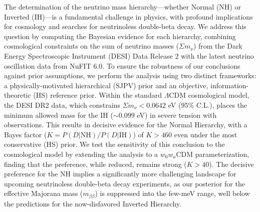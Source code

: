 \documentclass[]{article}
\begin{document}
The determination of the neutrino mass hierarchy—whether Normal (NH) or Inverted (IH)—is a fundamental challenge in physics, with profound implications for cosmology and searches for neutrinoless double-beta decay. We address this question by computing the Bayesian evidence for each hierarchy, combining cosmological constraints on the sum of neutrino masses ($\Sigma m_\nu$) from the Dark Energy Spectroscopic Instrument (DESI) Data Release 2 with the latest neutrino oscillation data from NuFIT 6.0. To ensure the robustness of our conclusions against prior assumptions, we perform the analysis using two distinct frameworks: a physically-motivated hierarchical (SJPV) prior and an objective, information-theoretic (HS) reference prior. Within the standard $\Lambda$CDM cosmological model, the DESI DR2 data, which constrains $\Sigma m_\nu < 0.0642$ eV (95\% C.L.), places the minimum allowed mass for the IH ($\sim 0.099$ eV) in severe tension with observations. This results in decisive evidence for the Normal Hierarchy, with a Bayes factor ($K = P(D|\text{NH}) / P(D|\text{IH})$) of $K > 460$ even under the most conservative (HS) prior. We test the sensitivity of this conclusion to the cosmological model by extending the analysis to a $w_0w_a$CDM parameterization, finding that the preference, while reduced, remains strong ($K > 40$). The decisive preference for the NH implies a significantly more challenging landscape for upcoming neutrinoless double-beta decay experiments, as our posterior for the effective Majorana mass ($m_{\beta\beta}$) is suppressed into the few-meV range, well below the predictions for the now-disfavored Inverted Hierarchy.
\end{document}
